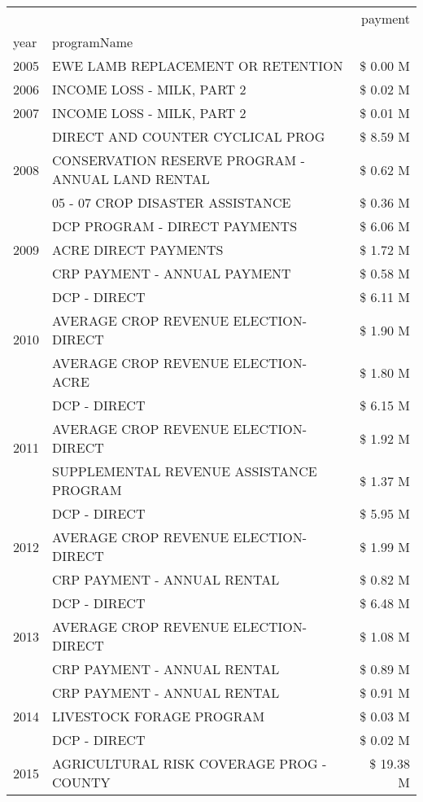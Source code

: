 \begin{tabular}{llr}
\toprule
 &  & payment \\
year & programName &  \\
\midrule
2005 & EWE LAMB REPLACEMENT OR RETENTION & \$ 0.00 M \\
\cline{1-3}
2006 & INCOME LOSS - MILK, PART 2 & \$ 0.02 M \\
\cline{1-3}
2007 & INCOME LOSS - MILK, PART 2 & \$ 0.01 M \\
\cline{1-3}
\multirow[t]{3}{*}{2008} & DIRECT AND COUNTER CYCLICAL PROG & \$ 8.59 M \\
 & CONSERVATION RESERVE PROGRAM - ANNUAL LAND RENTAL & \$ 0.62 M \\
 & 05 - 07 CROP DISASTER ASSISTANCE & \$ 0.36 M \\
\cline{1-3}
\multirow[t]{3}{*}{2009} & DCP PROGRAM - DIRECT PAYMENTS & \$ 6.06 M \\
 & ACRE DIRECT PAYMENTS & \$ 1.72 M \\
 & CRP PAYMENT - ANNUAL PAYMENT & \$ 0.58 M \\
\cline{1-3}
\multirow[t]{3}{*}{2010} & DCP - DIRECT & \$ 6.11 M \\
 & AVERAGE CROP REVENUE ELECTION-DIRECT & \$ 1.90 M \\
 & AVERAGE CROP REVENUE ELECTION-ACRE & \$ 1.80 M \\
\cline{1-3}
\multirow[t]{3}{*}{2011} & DCP - DIRECT & \$ 6.15 M \\
 & AVERAGE CROP REVENUE ELECTION-DIRECT & \$ 1.92 M \\
 & SUPPLEMENTAL REVENUE ASSISTANCE PROGRAM & \$ 1.37 M \\
\cline{1-3}
\multirow[t]{3}{*}{2012} & DCP - DIRECT & \$ 5.95 M \\
 & AVERAGE CROP REVENUE ELECTION-DIRECT & \$ 1.99 M \\
 & CRP PAYMENT - ANNUAL RENTAL & \$ 0.82 M \\
\cline{1-3}
\multirow[t]{3}{*}{2013} & DCP - DIRECT & \$ 6.48 M \\
 & AVERAGE CROP REVENUE ELECTION-DIRECT & \$ 1.08 M \\
 & CRP PAYMENT - ANNUAL RENTAL & \$ 0.89 M \\
\cline{1-3}
\multirow[t]{3}{*}{2014} & CRP PAYMENT - ANNUAL RENTAL & \$ 0.91 M \\
 & LIVESTOCK FORAGE PROGRAM & \$ 0.03 M \\
 & DCP - DIRECT & \$ 0.02 M \\
\cline{1-3}
\multirow[t]{3}{*}{2015} & AGRICULTURAL RISK COVERAGE PROG - COUNTY & \$ 19.38 M \\

\end{tabular}
